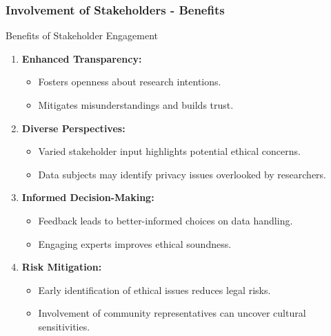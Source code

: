 \documentclass{beamer}
\begin{document}
\begin{frame}[fragile]
    \frametitle{Involvement of Stakeholders - Benefits}
    \begin{block}{Benefits of Stakeholder Engagement}
        \begin{enumerate}
            \item \textbf{Enhanced Transparency:}
            \begin{itemize}
                \item Fosters openness about research intentions.
                \item Mitigates misunderstandings and builds trust.
            \end{itemize}
            
            \item \textbf{Diverse Perspectives:}
            \begin{itemize}
                \item Varied stakeholder input highlights potential ethical concerns.
                \item Data subjects may identify privacy issues overlooked by researchers.
            \end{itemize}
            
            \item \textbf{Informed Decision-Making:}
            \begin{itemize}
                \item Feedback leads to better-informed choices on data handling.
                \item Engaging experts improves ethical soundness.
            \end{itemize}
            
            \item \textbf{Risk Mitigation:}
            \begin{itemize}
                \item Early identification of ethical issues reduces legal risks.
                \item Involvement of community representatives can uncover cultural sensitivities.
            \end{itemize}
        \end{enumerate}
    \end{block}
\end{frame}
\end{document}
